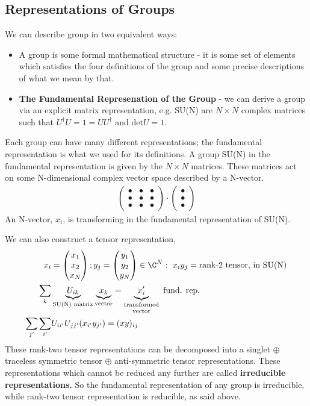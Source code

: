\documentclass[relqm.tex]{subfiles}
\begin{document}
\subsection{Representations of Groups}
We can describe group in two equivalent ways:
\begin{itemize}
    \item A group is some formal mathematical structure - it is some set of elements which satisfies the four definitions of the group and some precise descriptions of what we mean by that.
    \item \textbf{The Fundamental Represenation of the Group} - we can derive a group via an explicit matrix representation, e.g. SU(N) are $N\times N$ complex matrices such that $U^\dagger U=1 = UU^\dagger$ and $\text{det}U=1$.
\end{itemize}
Each group can have many different representations; the fundamental representation is what we used for its definitions.
A group SU(N) in the fundamental representation is given by the $N\times N$ matrices.
These matrices act on some N-dimensional complex vector space described by a N-vector.
\begin{align}
    \begin{pmatrix} \bullet & \bullet & \bullet \\ \bullet & \bullet & \bullet \\ \bullet & \bullet & \bullet \end{pmatrix} \cdot \begin{pmatrix} \bullet \\ \bullet \\ \bullet\end{pmatrix}
\end{align}
An N-vector, $x_i$, is transforming in the fundamental representation of SU(N).

We can also construct a tensor representation,
\begin{align}
    x_i &= \begin{pmatrix} x_1\\ x_2\\x_N\end{pmatrix};y_j = \begin{pmatrix}y_1\\y_2\\y_N\end{pmatrix} \in \C^N:~ x_iy_j = \text{rank-2 tensor, in SU(N)} \\
    \sum_k & \underbrace{U_{ik}}_{\text{SU(N) matrix}}\underbrace{x_k}_{\text{vector}} = \underbrace{x'_i}_{\text{\shortstack{transformed\\ vector}}} \text{ fund. rep.} \\
    \sum_{j'}\sum_{i'} & U_{ii'}U_{jj'}(x_{i'}y_{j'}) = (xy)_{ij}
\end{align}
These rank-two tensor representations can be decomposed into a singlet $\oplus$ traceless symmetric tensor $\oplus$ anti-symmetric tensor representations.
These representations which cannot be reduced any further are called \textbf{irreducible representations.}
So the fundamental representation of any group is irreducible, while rank-two tensor representation is reducible, as said above.
\end{document}
